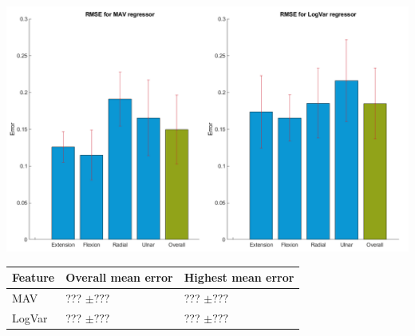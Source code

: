 \documentclass[landscape,a0paper,fontscale=0.375]{baposter} %
\begin{document}
\begin{poster}
{\begin{multicols}{2}
\begin{center}
	\includegraphics[width=1\linewidth]{RMSEBarPlotNewData}
\end{center}
	
	\begin{center}
		\begin{tabular}{l l l}
			\toprule
			\textbf{Feature} & \textbf{Overall mean error} & \textbf{Highest mean error}\\
			\midrule
			MAV & ??? $\pm ???$ & ??? $\pm ???$ \\
			LogVar & ??? $\pm ???$ & ??? $\pm ???$ \\
			\bottomrule
		\end{tabular}
	\end{center}

\end{multicols}


%
%
% 
}




\end{poster}
\end{document}
